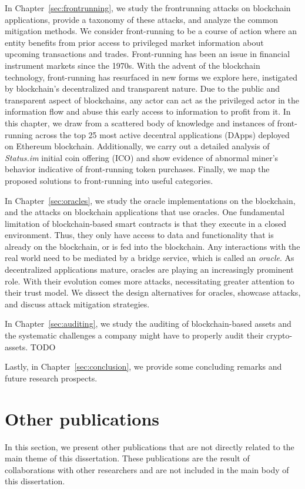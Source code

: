 In Chapter~\ref{sec:frontrunning}, we study the frontrunning attacks on blockchain applications, provide a taxonomy of these attacks, and analyze the common mitigation methods. We consider front-running to be a course of action where an entity benefits from prior access to privileged market information about upcoming transactions and trades. Front-running has been an issue in financial instrument markets since the 1970s. With the advent of the blockchain technology, front-running has resurfaced in new forms we explore here, instigated by blockchain’s decentralized and transparent nature. Due to the public and transparent aspect of blockchains, any actor can act as the privileged actor in the information flow and abuse this early access to information to profit from it. In this chapter, we draw from a scattered body of knowledge and instances of front-running across the top 25 most active decentral applications (DApps) deployed on Ethereum blockchain. Additionally, we carry out a detailed analysis of \textit{Status.im} initial coin offering (ICO) and show evidence of abnormal miner’s behavior indicative of front-running token purchases. Finally, we map the proposed solutions to front-running into useful categories.


In Chapter~\ref{sec:oracles}, we study the oracle implementations on the blockchain, and the attacks on blockchain applications that use oracles. One fundamental limitation of blockchain-based smart contracts is that they execute in a closed environment. Thus, they only have access to data and functionality that is already on the blockchain, or is fed into the blockchain. Any interactions with the real world need to be mediated by a bridge service, which is called an \textit{oracle}. As decentralized applications mature, oracles are playing an increasingly prominent role. With their evolution comes more attacks, necessitating greater attention to their trust model. We dissect the design alternatives for oracles, showcase attacks, and discuss attack mitigation strategies.


In Chapter~\ref{sec:auditing}, we study the auditing of blockchain-based assets and the systematic challenges a company might have to properly audit their crypto-assets. TODO %


Lastly, in Chapter~\ref{sec:conclusion}, we provide some concluding remarks and future research prospects.


\section{Other publications}
In this section, we present other publications that are not directly related to the main theme of this dissertation. These publications are the result of collaborations with other researchers and are not included in the main body of this dissertation.

